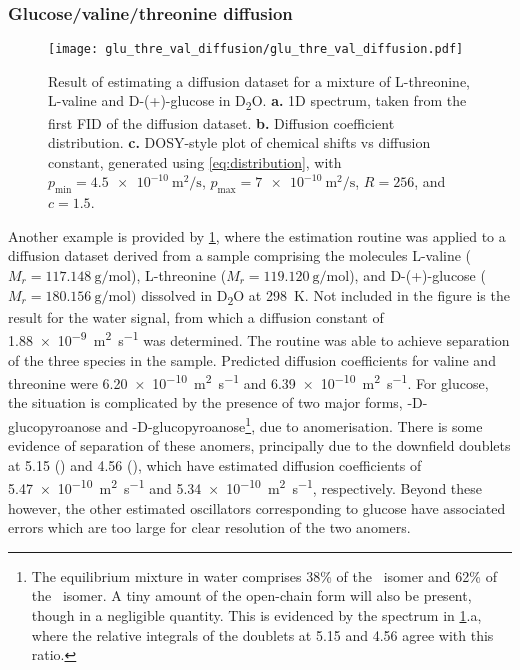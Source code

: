 \subsubsection{Glucose/valine/threonine diffusion}
\begin{figure}
    \centering
    \texttt{[image: glu\_thre\_val\_diffusion/glu\_thre\_val\_diffusion.pdf]}
    \caption[
        Result of estimating a diffusion dataset for a mixture of L-threonine,
        L-valine and D-(+)-glucose.
    ]{
        Result of estimating a diffusion dataset for a mixture of L-threonine,
        L-valine and D-(+)-glucose in D\textsubscript{2}O.
        \textbf{a.} \acs{1D} spectrum, taken from the first \acs{FID} of the
        diffusion dataset.
        \textbf{b.} Diffusion coefficient distribution.
        \textbf{c.} \acs{DOSY}-style plot of chemical shifts vs diffusion
        constant, generated using \cref{eq:distribution}, with
        $p_{\text{min}} = \qty{4.5e-10}{\meter\squared\per\second}$,
        $p_{\text{max}} = \qty{7e-10}{\meter\squared\per\second}$,
        $R=256$, and $c=1.5$.
    }
    \label{fig:gluc_val_thre}
\end{figure}
Another example is provided by \cref{fig:gluc_val_thre}, where the
estimation routine was applied to a diffusion dataset derived from a sample
comprising the molecules
L-valine ($M_r = \qty{117.148}{\gram\per\mole}$),
L-threonine ($M_r = \qty{119.120}{\gram\per\mole}$),
and D-(+)-glucose ($M_r = \qty{180.156}{\gram\per\mole})$ dissolved in
D\textsubscript{2}O at \qty{298}{\kelvin}. Not included in the figure is the
result for the water
signal, from which a diffusion constant of
\qty{1.88e-9}{\meter\squared\per\second} was determined. The routine was able
to achieve separation of the three species in the sample. Predicted diffusion
coefficients for valine and threonine were
\qty{6.20e-10}{\meter\squared\per\second} and
\qty{6.39e-10}{\meter\squared\per\second}. For glucose, the situation is
complicated by the presence of two major forms, \textalpha-D-glucopyroanose and
\textbeta-D-glucopyroanose\footnote{
    The equilibrium mixture in water comprises 38\% of the \textalpha\ isomer
    and 62\% of the \textbeta\ isomer. A tiny amount of the open-chain form will
    also be present, though in a negligible quantity. This is evidenced by the
    spectrum in \cref{fig:gluc_val_thre}.a, where the relative integrals of
    the doublets at \qty{5.15}{\partspermillion} and
    \qty{4.56}{\partspermillion} agree with this ratio.
}, due to anomerisation\cite[Chapter 3]{Davis2002}.
There is some evidence of separation of these anomers, principally due
to the downfield doublets at \qty{5.15}{\partspermillion} (\textalpha) and
\qty{4.56}{\partspermillion} (\textbeta), which have estimated diffusion
coefficients of \qty{5.47e-10}{\meter\squared\per\second}
and \qty{5.34e-10}{\meter\squared\per\second}, respectively. Beyond these
however, the other estimated oscillators corresponding to glucose have
associated errors which are too large for clear resolution of the two anomers.

